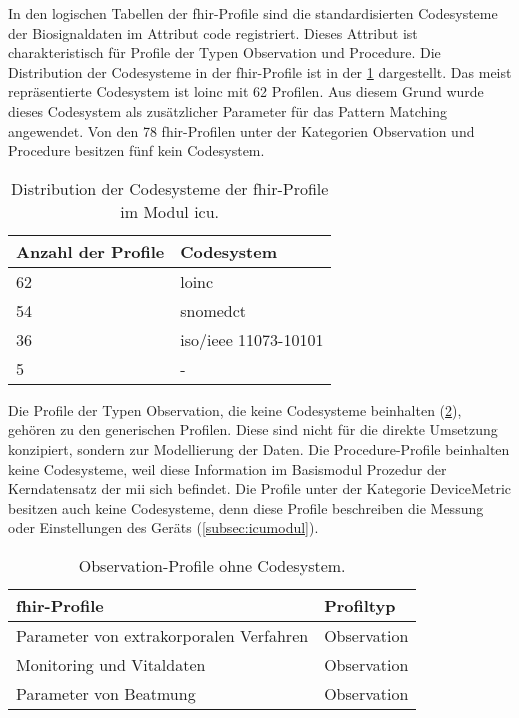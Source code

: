 In den logischen Tabellen der \ac{fhir}-Profile sind die standardisierten Codesysteme der Biosignaldaten im Attribut \glqq code\grqq{} registriert. Dieses Attribut ist charakteristisch für Profile der Typen \glqq Observation\grqq{} und \glqq Procedure\grqq{}. Die Distribution der Codesysteme in der \ac{fhir}-Profile ist in der \ref{tab:profilcodes} dargestellt. Das meist repräsentierte Codesystem ist \ac{loinc} mit 62 Profilen. Aus diesem Grund wurde dieses Codesystem als zusätzlicher Parameter für das Pattern Matching angewendet. Von den 78 \ac{fhir}-Profilen unter der Kategorien \glqq Observation\grqq{} und \glqq Procedure\grqq{} besitzen fünf kein Codesystem.


\begin{table}[ht]
	\centering 
	\caption[Codesysteme der \acs{fhir}-Profile im Modul \glqq\acs{icu}\grqq{}]{Distribution der Codesysteme der \acs{fhir}-Profile im Modul \glqq\acs{icu}\grqq{}.}
	\label{tab:profilcodes}
	\begin{tabular}{|l|l|}
		\hline
		\bfseries Anzahl der Profile & \bfseries Codesystem \\ \hline		
		62 & \ac{loinc} \\ \hline
		54 & \ac{snomedct} \\ \hline   
		36 & \acs{iso}/\acs{ieee} 11073-10101\texttrademark{} \\ \hline
		5 & - \\ \hline
	\end{tabular}
\end{table}

Die Profile der Typen \glqq Observation\grqq{}, die keine Codesysteme beinhalten (\ref{tab:profilnocode}), gehören zu den generischen Profilen. Diese sind nicht für die direkte Umsetzung konzipiert, sondern zur Modellierung der Daten. Die \glqq Procedure\grqq{}-Profile beinhalten keine Codesysteme, weil diese Information im Basismodul \glqq Prozedur\grqq{} der Kerndatensatz der \ac{mii} sich befindet. Die Profile unter der Kategorie \glqq DeviceMetric\grqq{} besitzen auch keine Codesysteme, denn diese Profile beschreiben die Messung oder Einstellungen des Geräts (\ref{subsec:icumodul}).

\begin{table}[ht]
	\centering  
	\caption[\glqq Observation\grqq{}-Profile ohne Codesystem]{\glqq Observation\grqq{}-Profile ohne Codesystem.}
	\label{tab:profilnocode}
	\begin{tabular}{|p{8.5cm}|l|}
		\hline 
		\bfseries \ac{fhir}-Profile & \bfseries Profiltyp \\ \hline
		Parameter von extrakorporalen Verfahren & Observation \\ \hline
		Monitoring und Vitaldaten & Observation \\ \hline
		Parameter von Beatmung & Observation \\ \hline
	\end{tabular}
\end{table}

